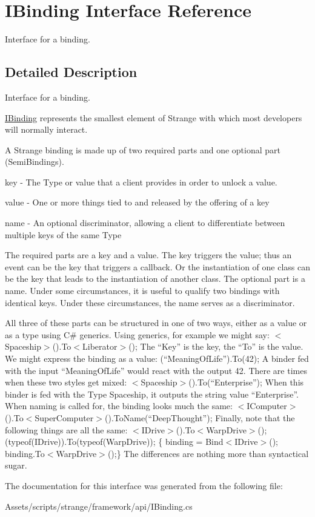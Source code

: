 \hypertarget{interface_i_binding}{\section{I\-Binding Interface Reference}
\label{interface_i_binding}
}


Interface for a binding.  




\subsection{Detailed Description}
Interface for a binding. 

\hyperlink{interface_i_binding}{I\-Binding} represents the smallest element of Strange with which most developers will normally interact.

A Strange binding is made up of two required parts and one optional part (Semi\-Bindings). 
\begin{DoxyItemize}
\item key -\/ The Type or value that a client provides in order to unlock a value. 
\item value -\/ One or more things tied to and released by the offering of a key 
\item name -\/ An optional discriminator, allowing a client to differentiate between multiple keys of the same Type 
\end{DoxyItemize}

The required parts are a key and a value. The key triggers the value; thus an event can be the key that triggers a callback. Or the instantiation of one class can be the key that leads to the instantiation of another class. The optional part is a name. Under some circumstances, it is useful to qualify two bindings with identical keys. Under these circumstances, the name serves as a discriminator. \par
 All three of these parts can be structured in one of two ways, either as a value or as a type using C\# generics. Using generics, for example we might say\-: $<$\-Spaceship$>$().To$<$\-Liberator$>$(); The “\-Key” is the key, the “\-To” is the value. We might express the binding as a value\-: (“\-Meaning\-Of\-Life”).To(42); A binder fed with the input “\-Meaning\-Of\-Life” would react with the output 42. There are times when these two styles get mixed\-: $<$\-Spaceship$>$().To(“\-Enterprise”); When this binder is fed with the Type Spaceship, it outputs the string value “\-Enterprise”. When naming is called for, the binding looks much the same\-: $<$\-I\-Computer$>$().To$<$\-Super\-Computer$>$().To\-Name(“\-Deep\-Thought”); Finally, note that the following things are all the same\-: $<$\-I\-Drive$>$().To$<$\-Warp\-Drive$>$(); (typeof(\-I\-Drive)).To(typeof(\-Warp\-Drive)); \{ binding = Bind$<$\-I\-Drive$>$(); binding.\-To$<$\-Warp\-Drive$>$();\} The differences are nothing more than syntactical sugar. 

The documentation for this interface was generated from the following file\-:\begin{DoxyCompactItemize}
\item 
Assets/scripts/strange/framework/api/I\-Binding.\-cs\end{DoxyCompactItemize}
